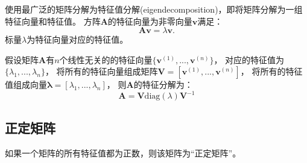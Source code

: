 使用最广泛的矩阵分解为特征值分解(eigendecomposition)，即将矩阵分解为一组特征向量和特征值。
方阵$\bm{A}$的特征向量为非零向量$\bm{v}$满足：
\begin{equation}
  \label{eq:eigendefunction}
  \bm{Av} = \lambda \bm{v}.
\end{equation}
标量$\lambda$为特征向量对应的特征值。

假设矩阵$\bm{A}$有$n$个线性无关的的特征向量$\{\bm{v}^{(1)}, ..., \bm{v}^{(n)}\}$，
对应的特征值为$\{\lambda_1, ... , \lambda_n\}$，
将所有的特征向量组成矩阵$\bm{V} = [\bm{v}^{(1)}, ..., \bm{v}^{(n)}]$，
将所有的特征值组成向量$\bm{\lambda} = [\lambda_1, ... , \lambda_n]$，
则$\bm{A}$的特征分解为：
\begin{equation}
  \label{eq:eigendecomposition}
  \bm{A} = \bm{V}\text{diag}(\lambda)\bm{V}^{-1}
\end{equation}

\subsection{正定矩阵}

如果一个矩阵的所有特征值都为正数，则该矩阵为“正定矩阵”。

